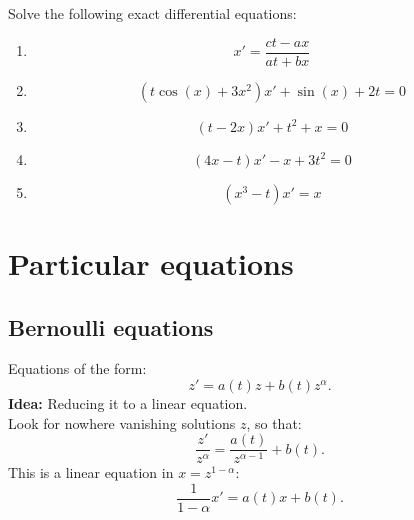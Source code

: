 \\
\\

\begin{Pb}
Solve the following exact differential equations:
\begin{enumerate}
\item \[x' = \frac{ct-ax}{at+bx}\]
\item \[ (t \cos(x) + 3x^2 ) x' + \sin (x) + 2t = 0\]
\item \[ (t-2x)x' + t^2 + x  = 0\]
\item \[(4x-t)x' - x+ 3t^2 = 0\]
\item \[ (x^3-t) x' =x\]
\end{enumerate}
\end{Pb}

\section{Particular equations}

\subsection{Bernoulli equations}

Equations of the form: \[z' = a(t)z +b(t)z^\alpha. \]
\textbf{Idea:} Reducing it to a linear equation.\\

Look for nowhere vanishing solutions $z$, so that:
\[\frac{z'}{z^\alpha} = \frac{a(t) }{z^{\alpha-1}} + b(t).\]
This is a linear equation in $x= z^{1-\alpha}$:
\[\frac{1}{1-\alpha} x' = a(t)x + b(t).\]
 
